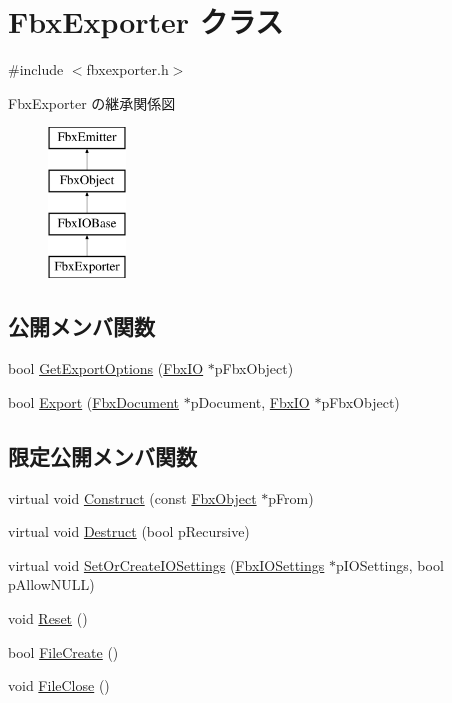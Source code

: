 \hypertarget{class_fbx_exporter}{}\section{Fbx\+Exporter クラス}
\label{class_fbx_exporter}


{\ttfamily \#include $<$fbxexporter.\+h$>$}

Fbx\+Exporter の継承関係図\begin{figure}[H]
\begin{center}
\leavevmode
\includegraphics[height=4.000000cm]{class_fbx_exporter}
\end{center}
\end{figure}
\subsection*{公開メンバ関数}
\begin{DoxyCompactItemize}
\item 
bool \hyperlink{class_fbx_exporter_a0e26854a47b1fdbc100332b131552b7e}{Get\+Export\+Options} (\hyperlink{class_fbx_i_o}{Fbx\+IO} $\ast$p\+Fbx\+Object)
\item 
bool \hyperlink{class_fbx_exporter_ae14616d7e29cd9ae52cd6bbccd6d6988}{Export} (\hyperlink{class_fbx_document}{Fbx\+Document} $\ast$p\+Document, \hyperlink{class_fbx_i_o}{Fbx\+IO} $\ast$p\+Fbx\+Object)
\end{DoxyCompactItemize}
\subsection*{限定公開メンバ関数}
\begin{DoxyCompactItemize}
\item 
virtual void \hyperlink{class_fbx_exporter_aa308b9a9901e8c98d0b54f0bd20daad2}{Construct} (const \hyperlink{class_fbx_object}{Fbx\+Object} $\ast$p\+From)
\item 
virtual void \hyperlink{class_fbx_exporter_a0a2569f6ed2ffaa165d9bdb1959f0599}{Destruct} (bool p\+Recursive)
\item 
virtual void \hyperlink{class_fbx_exporter_a1684b8488befbd05433963007bbaf3ad}{Set\+Or\+Create\+I\+O\+Settings} (\hyperlink{class_fbx_i_o_settings}{Fbx\+I\+O\+Settings} $\ast$p\+I\+O\+Settings, bool p\+Allow\+N\+U\+LL)
\item 
void \hyperlink{class_fbx_exporter_a2ee7ea29532a88c85f811eff793a5961}{Reset} ()
\item 
bool \hyperlink{class_fbx_exporter_a212dd139e703f6531bb6cf0ba1bc88d9}{File\+Create} ()
\item 
void \hyperlink{class_fbx_exporter_a7802b8f3aaf4598bb8e799d0f2c829be}{File\+Close} ()
\end{DoxyCompactItemize}
